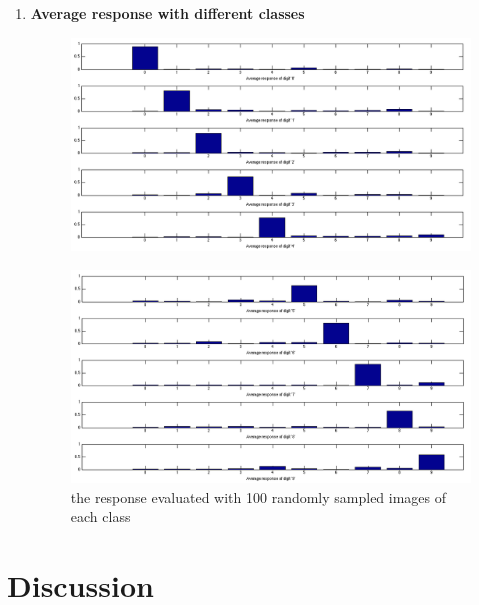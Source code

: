 \documentclass[12pt]{article}
\begin{document}
\begin{enumerate}
	\newpage
	\item {\bf Average response with different classes}
	\begin{figure}[ht]
		\includegraphics[scale=.5]{../res/resp0-4.png}
		\vspace*{-2em}
	\end{figure}
	\begin{figure}[ht]
		\vspace*{-2em}
		\includegraphics[scale=.5]{../res/resp5-9.png}
		\caption{the response evaluated with 100 randomly sampled images of each class}
		\vspace*{-2em}
	\end{figure}
\end{enumerate}


\newpage
\section*{Discussion}
\vspace{-20pt}
\noindent\makebox[\linewidth]{\rule{\textwidth}{0.4pt}}
\end{document}
